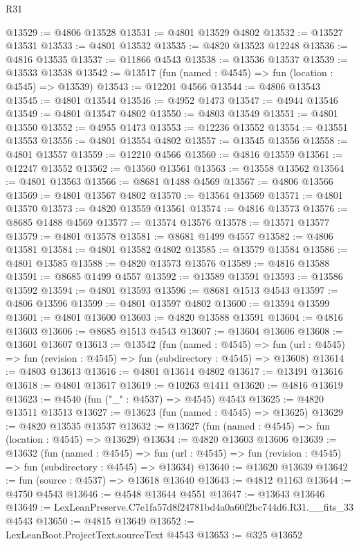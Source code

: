 \begin{lexlean}{R31}
\begin{coremodule}
@13529 := @4806 @13528
@13531 := @4801 @13529 @4802
@13532 := @13527 @13531
@13533 := @4801 @13532
@13535 := @4820 @13523 @12248
@13536 := @4816 @13535
@13537 := @11866 @4543
@13538 := @13536 @13537
@13539 := @13533 @13538
@13542 := @13517 (fun (named : @4545) => fun (location : @4545) => @13539)
@13543 := @12201 @4566
@13544 := @4806 @13543
@13545 := @4801 @13544
@13546 := @4952 @1473
@13547 := @4944 @13546
@13549 := @4801 @13547 @4802
@13550 := @4803 @13549
@13551 := @4801 @13550
@13552 := @4955 @1473
@13553 := @12236 @13552
@13554 := @13551 @13553
@13556 := @4801 @13554 @4802
@13557 := @13545 @13556
@13558 := @4801 @13557
@13559 := @12210 @4566
@13560 := @4816 @13559
@13561 := @12247 @13552
@13562 := @13560 @13561
@13563 := @13558 @13562
@13564 := @4801 @13563
@13566 := @8681 @1488 @4569
@13567 := @4806 @13566
@13569 := @4801 @13567 @4802
@13570 := @13564 @13569
@13571 := @4801 @13570
@13573 := @4820 @13559 @13561
@13574 := @4816 @13573
@13576 := @8685 @1488 @4569
@13577 := @13574 @13576
@13578 := @13571 @13577
@13579 := @4801 @13578
@13581 := @8681 @1499 @4557
@13582 := @4806 @13581
@13584 := @4801 @13582 @4802
@13585 := @13579 @13584
@13586 := @4801 @13585
@13588 := @4820 @13573 @13576
@13589 := @4816 @13588
@13591 := @8685 @1499 @4557
@13592 := @13589 @13591
@13593 := @13586 @13592
@13594 := @4801 @13593
@13596 := @8681 @1513 @4543
@13597 := @4806 @13596
@13599 := @4801 @13597 @4802
@13600 := @13594 @13599
@13601 := @4801 @13600
@13603 := @4820 @13588 @13591
@13604 := @4816 @13603
@13606 := @8685 @1513 @4543
@13607 := @13604 @13606
@13608 := @13601 @13607
@13613 := @13542
    (fun (named : @4545) =>
    fun (url : @4545) => fun (revision : @4545) => fun (subdirectory : @4545) => @13608)
@13614 := @4803 @13613
@13616 := @4801 @13614 @4802
@13617 := @13491 @13616
@13618 := @4801 @13617
@13619 := @10263 @1411
@13620 := @4816 @13619
@13623 := @4540 (fun ("_" : @4537) => @4545) @4543
@13625 := @4820 @13511 @13513
@13627 := @13623 (fun (named : @4545) => @13625)
@13629 := @4820 @13535 @13537
@13632 := @13627 (fun (named : @4545) => fun (location : @4545) => @13629)
@13634 := @4820 @13603 @13606
@13639 := @13632
    (fun (named : @4545) =>
    fun (url : @4545) => fun (revision : @4545) => fun (subdirectory : @4545) => @13634)
@13640 := @13620 @13639
@13642 := fun (source : @4537) => @13618 @13640
@13643 := @4812 @1163
@13644 := @4750 @4543
@13646 := @4548 @13644 @4551
@13647 := @13643 @13646
@13649 := LexLeanPreserve.C7e1fa57d8f24781bd4a0a60f2bc744d6.R31.__fits_33 @4543
@13650 := @4815 @13649
@13652 := LexLeanBoot.ProjectText.sourceText @4543
@13653 := @325 @13652

\end{coremodule}
\end{lexlean}

